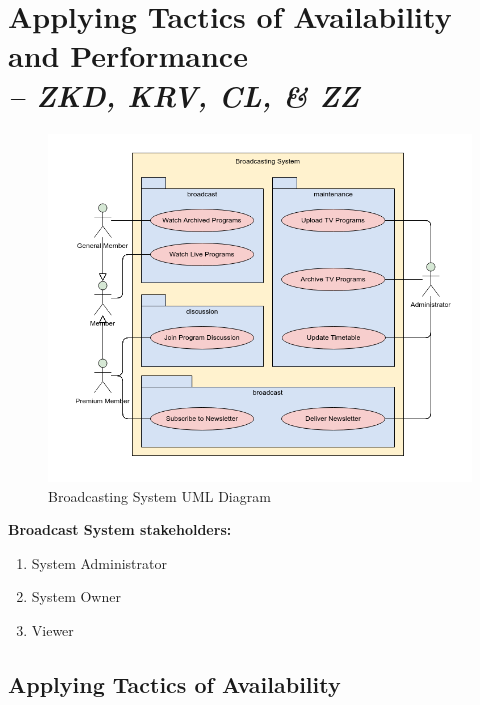 \chapter{Applying Tactics of Availability and Performance \\
\small{\textit{-- ZKD, KRV, CL, \& ZZ}}
\label{Chapter::ApplyingTactics}}

\begin{figure}[h]
    \centering
    \caption{\label{Figure:::BroadcastingSystemUMLDiagram}Broadcasting System UML Diagram}
    \includegraphics[scale=0.5]{Book-SSW565/png/UML Diagram.png} 
\end{figure}

\textbf{Broadcast System \gls{stakeholder}s:}
\begin{enumerate}
    \item System Administrator
    \item System Owner
    \item Viewer
\end{enumerate}

\section{Applying Tactics of Availability \label{Section::Applying Tactics of Availability}}

